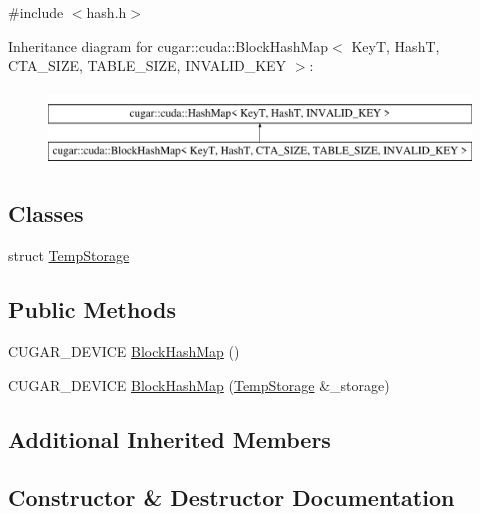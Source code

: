 {\ttfamily \#include $<$hash.\+h$>$}

Inheritance diagram for cugar\+:\+:cuda\+:\+:Block\+Hash\+Map$<$ KeyT, HashT, C\+T\+A\+\_\+\+S\+I\+ZE, T\+A\+B\+L\+E\+\_\+\+S\+I\+ZE, I\+N\+V\+A\+L\+I\+D\+\_\+\+K\+EY $>$\+:\begin{figure}[H]
\begin{center}
\leavevmode
\includegraphics[height=2.000000cm]{structcugar_1_1cuda_1_1_block_hash_map}
\end{center}
\end{figure}
\subsection*{Classes}
\begin{DoxyCompactItemize}
\item 
struct \hyperlink{structcugar_1_1cuda_1_1_block_hash_map_1_1_temp_storage}{Temp\+Storage}
\end{DoxyCompactItemize}
\subsection*{Public Methods}
\begin{DoxyCompactItemize}
\item 
C\+U\+G\+A\+R\+\_\+\+D\+E\+V\+I\+CE \hyperlink{structcugar_1_1cuda_1_1_block_hash_map_aaac2f72bcf6fd716470f4502b0dbcb4d}{Block\+Hash\+Map} ()
\item 
C\+U\+G\+A\+R\+\_\+\+D\+E\+V\+I\+CE \hyperlink{structcugar_1_1cuda_1_1_block_hash_map_abf5f1d2196ccc4cba94c0d4bb7d11265}{Block\+Hash\+Map} (\hyperlink{structcugar_1_1cuda_1_1_block_hash_map_1_1_temp_storage}{Temp\+Storage} \&\+\_\+storage)
\end{DoxyCompactItemize}
\subsection*{Additional Inherited Members}


\subsection{Constructor \& Destructor Documentation}
\mbox{\label{structcugar_1_1cuda_1_1_block_hash_map_aaac2f72bcf6fd716470f4502b0dbcb4d}} 
